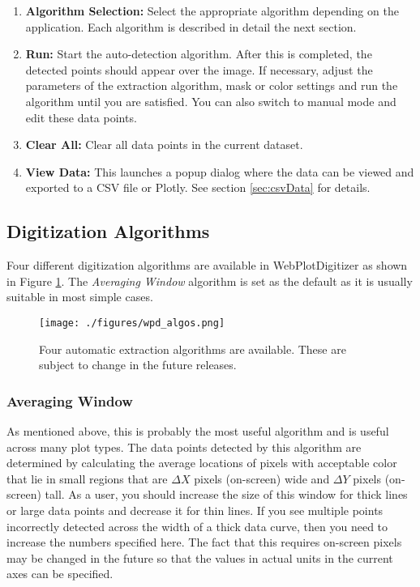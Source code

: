 \documentclass[letterpaper, 10pt]{article}
\begin{document}
\begin{enumerate}
\begin{enumerate}
\end{enumerate}
\item{{\bf Algorithm Selection: }Select the appropriate algorithm depending on the application. Each algorithm is described in detail the next section.}
\item{{\bf Run: }Start the auto-detection algorithm. After this is completed, the detected points should appear over the image. If necessary, adjust the parameters of the extraction algorithm, mask or color settings and run the algorithm until you are satisfied. You can also switch to manual mode and edit these data points.}
\item{{\bf Clear All: }Clear all data points in the current dataset.}
\item{{\bf View Data: }This launches a popup dialog where the data can be viewed and exported to a CSV file or Plotly. See section \ref{sec:csvData} for details.}
\end{enumerate}

\subsection{Digitization Algorithms}
Four different digitization algorithms are available in WebPlotDigitizer as shown in Figure \ref{fig:autoExtractAlgos}. The \emph{Averaging Window} algorithm is set as the default as it is usually suitable in most simple cases.
\begin{figure}
\begin{center}
\texttt{[image: ./figures/wpd\_algos.png]}
\caption{Four automatic extraction algorithms are available. These are subject to change in the future releases.}
\label{fig:autoExtractAlgos}
\end{center}
\end{figure}
\subsubsection{Averaging Window}
As mentioned above, this is probably the most useful algorithm and is useful across many plot types. The data points detected by this algorithm are determined by calculating the average locations of pixels with acceptable color that lie in small regions that are $\Delta X$ pixels (on-screen) wide and $\Delta Y$ pixels (on-screen) tall. As a user, you should increase the size of this window for thick lines or large data points and decrease it for thin lines. If you see multiple points incorrectly detected across the width of a thick data curve, then you need to increase the numbers specified here. The fact that this requires on-screen pixels may be changed in the future so that the values in actual units in the current axes can be specified.
\end{document}
